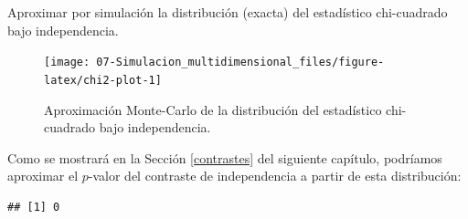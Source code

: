 \documentclass[
]{book}
\newenvironment{Shaded}{\begin{snugshade}}{\end{snugshade}}
\newcommand{\AttributeTok}[1]{\textcolor[rgb]{0.77,0.63,0.00}{#1}}
\newcommand{\CommentTok}[1]{\textcolor[rgb]{0.56,0.35,0.01}{\textit{#1}}}
\newcommand{\ConstantTok}[1]{\textcolor[rgb]{0.00,0.00,0.00}{#1}}
\newcommand{\ControlFlowTok}[1]{\textcolor[rgb]{0.13,0.29,0.53}{\textbf{#1}}}
\newcommand{\DecValTok}[1]{\textcolor[rgb]{0.00,0.00,0.81}{#1}}
\newcommand{\FunctionTok}[1]{\textcolor[rgb]{0.00,0.00,0.00}{#1}}
\newcommand{\NormalTok}[1]{#1}
\newcommand{\OtherTok}[1]{\textcolor[rgb]{0.56,0.35,0.01}{#1}}
\newcommand{\SpecialCharTok}[1]{\textcolor[rgb]{0.00,0.00,0.00}{#1}}
\newcommand{\StringTok}[1]{\textcolor[rgb]{0.31,0.60,0.02}{#1}}
\theoremstyle{break}
\theoremstyle{definition}
\theoremstyle{definition}
\theoremstyle{definition}
\theoremstyle{definition}
\theoremstyle{remark}
\begin{document}
Aproximar por simulación la distribución (exacta) del estadístico chi-cuadrado bajo independencia.

\begin{Shaded}
\end{Shaded}

\begin{figure}[!htb]

{\centering \texttt{[image: 07-Simulacion\_multidimensional\_files/figure-latex/chi2-plot-1]} 

}

\caption{Aproximación Monte-Carlo de la distribución del estadístico chi-cuadrado bajo independencia.}\label{fig:chi2-plot}
\end{figure}

Como se mostrará en la Sección \ref{contrastes} del siguiente capítulo, podríamos aproximar el \(p\)-valor del contraste de independencia a partir de esta distribución:

\begin{Shaded}
\end{Shaded}

\begin{verbatim}
## [1] 0
\end{verbatim}
\end{document}

